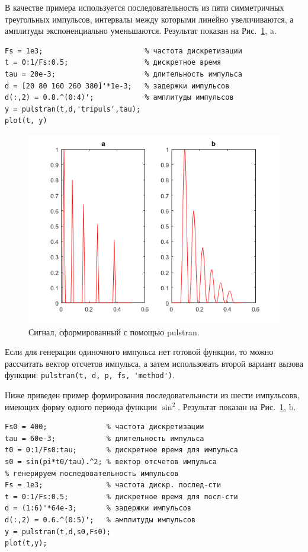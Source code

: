 \documentclass[12pt,a4paper]{article}
\begin{document}
В качестве примера используется последовательность из пяти симметричных треугольных импульсов, интервалы между которыми линейно увеличиваются, а амплитуды экспоненциально уменьшаются. Результат показан на Рис.~\ref{fig:img_pulstran}, a.
\begin{verbatim}
Fs = 1e3;                        % частота дискретизации
t = 0:1/Fs:0.5;                  % дискретное время
tau = 20e-3;                     % длительность импульса
d = [20 80 160 260 380]'*1e-3;   % задержки импульсов
d(:,2) = 0.8.^(0:4)';            % амплитуды импульсов
y = pulstran(t,d,'tripuls',tau);
plot(t, y)
\end{verbatim}
\begin{figure}[!ht]
  \centering
  \includegraphics[width=\linewidth]{img_pulstran}
  \caption{Сигнал, сформированный с помощью pulstran.}
  \label{fig:img_pulstran}
\end{figure}

Если для генерации одиночного импульса нет готовой функции, то можно рассчитать вектор отсчетов импульса, а затем использовать второй вариант вызова функции: \verb|pulstran(t, d, p, fs, 'method')|.

Ниже приведен пример формирования последовательности из шести импульсовв, имеющих форму одного периода функции $\sin^2$. Результат показан на Рис.~\ref{fig:img_pulstran}, b.
\begin{verbatim}
Fs0 = 400;              % частота дискретизации
tau = 60e-3;            % длительность импульса
t0 = 0:1/Fs0:tau;       % дискретное время для импульса
s0 = sin(pi*t0/tau).^2; % вектор отсчетов импульса
% генерируем последовательность импульсов
Fs = 1e3;               % частота дискр. послед-сти
t = 0:1/Fs:0.5;         % дискретное время для посл-сти
d = (1:6)'*64e-3;       % задержки импульсов
d(:,2) = 0.6.^(0:5)';   % амплитуды импульсов
y = pulstran(t,d,s0,Fs0);
plot(t,y);
\end{verbatim}
\end{document}
